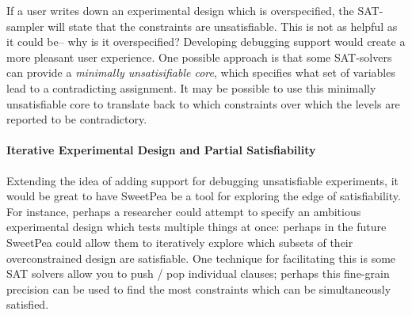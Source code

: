 If a user writes down an experimental design which is overspecified, the SAT-sampler will state that the constraints are unsatisfiable. This is not as helpful as it could be-- why is it overspecified? Developing debugging support would create a more pleasant user experience. One possible approach is that some SAT-solvers can provide a \emph{minimally unsatisifiable core}, which specifies what set of variables lead to a contradicting assignment. It may be possible to use this minimally unsatisfiable core to translate back to which constraints over which the levels are reported to be contradictory.

\paragraph*{Iterative Experimental Design and Partial Satisfiability}

Extending the idea of adding support for debugging unsatisfiable experiments, it would be great to have SweetPea be a tool for exploring the edge of satisfiability. For instance, perhaps a researcher could attempt to specify an ambitious experimental design which tests multiple things at once: perhaps in the future SweetPea could allow them to iteratively explore which subsets of their overconstrained design are satisfiable. One technique for facilitating this is some SAT solvers allow you to push / pop individual clauses; perhaps this fine-grain precision can be used to find the most constraints which can be simultaneously satisfied.

%
%
%
%
